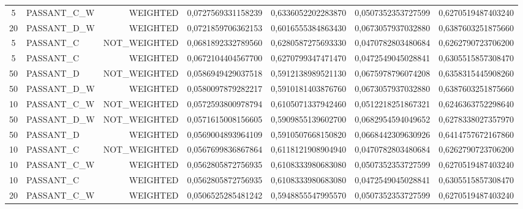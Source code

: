 \begin{table}[H]
{\begin{tabular}{ c l r c c c c }
	5 & PASSANT\_C\_W &   WEIGHTED & 0,0727569331158239 & 0,6336052202283870 & 0,0507352353727599 & 0,6270519487403240 \\
	
	20 & PASSANT\_D\_W &   WEIGHTED & 0,0721859706362153 & 0,6016555384863430 & 0,0673057937032880 & 0,6387603251875660 \\
	
	5 &  PASSANT\_C & NOT\_WEIGHTED & 0,0681892332789560 & 0,6280587275693330 & 0,0470782803480684 & 0,6262790723706200 \\
	
	5 &  PASSANT\_C &   WEIGHTED & 0,0672104404567700 & 0,6270799347471470 & 0,0472549045028841 & 0,6305515857308470 \\
	
	50 &  PASSANT\_D & NOT\_WEIGHTED & 0,0586949429037518 & 0,5912138989521130 & 0,0675978796074208 & 0,6358315445908260 \\
	
	50 & PASSANT\_D\_W &   WEIGHTED & 0,0580097879282217 & 0,5910181403876760 & 0,0673057937032880 & 0,6387603251875660 \\
	
	10 & PASSANT\_C\_W & NOT\_WEIGHTED & 0,0572593800978794 & 0,6105071337942460 & 0,0512218251867321 & 0,6246363752298640 \\
	
	50 & PASSANT\_D\_W & NOT\_WEIGHTED & 0,0571615008156605 & 0,5909855139602700 & 0,0682954594049652 & 0,6278338027357970 \\
	
	50 &  PASSANT\_D &   WEIGHTED & 0,0569004893964109 & 0,5910507668150820 & 0,0668442309630926 & 0,6414757672167860 \\
	
	10 &  PASSANT\_C & NOT\_WEIGHTED & 0,0567699836867864 & 0,6118121908904940 & 0,0470782803480684 & 0,6262790723706200 \\
	
	10 & PASSANT\_C\_W &   WEIGHTED & 0,0562805872756935 & 0,6108333980683080 & 0,0507352353727599 & 0,6270519487403240 \\
	
	10 &  PASSANT\_C &   WEIGHTED & 0,0562805872756935 & 0,6108333980683080 & 0,0472549045028841 & 0,6305515857308470 \\
	
	20 & PASSANT\_C\_W &   WEIGHTED & 0,0506525285481242 & 0,5948855547995570 & 0,0507352353727599 & 0,6270519487403240 \\
	

\end{tabular}}
\end{table}
